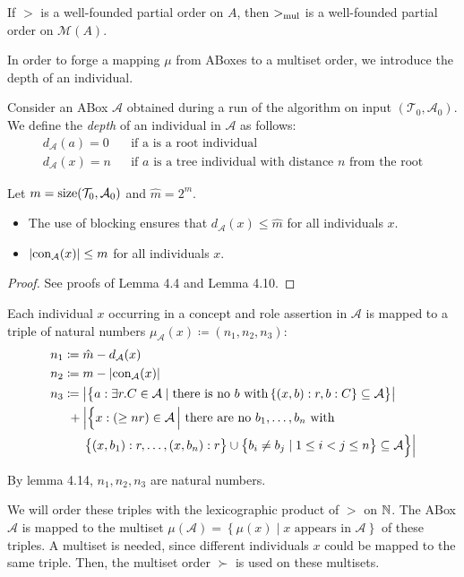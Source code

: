 \begin{theorem*}
	If $>$ is a well-founded partial order on $A$,
	then $>_{\mathit{\text{mul}}}$ is a well-founded partial order on $\mathcal{M}(A)$.
\end{theorem*}

In order to forge a mapping $\mu$ from ABoxes to a multiset order, we introduce the depth of an individual.

Consider an ABox $\mathcal{A}$ obtained during a run of the algorithm on input $(\mathcal{T}_0, \mathcal{A}_0)$.
We define the \textit{depth} of an individual in $\mathcal{A}$ as follows:
\begin{align*}
	d_{\mathcal{A}}(a) = 0 && \text{if a is a root individual}\\
	d_{\mathcal{A}}(x) = n && \text{if $a$ is a tree individual with distance $n$ from the root}
\end{align*}
\begin{lemma}
	Let $m = \operatorname{\text{size}}(\mathcal{T}_0, \mathcal{A}_0)$ and $\hat{m} = 2^m$.
	\begin{itemize}
		\item The use of blocking ensures that $d_{\mathcal{A}}(x) \leq \hat{m}$ for all individuals $x$.
		\item $\lvert \operatorname{\text{con}}_{\mathcal{A}}(x)  \rvert \leq m$ for all individuals $x$.
	\end{itemize}
\end{lemma}
\begin{proof}
	See proofs of Lemma 4.4 and Lemma 4.10.
\end{proof}

Each individual $x$ occurring in a concept and role assertion in $\mathcal{A}$ is mapped to
a triple of natural numbers $\mu_{\mathcal{A}}(x) \coloneqq (n_1, n_2, n_3)$:
\[
\begin{split}
	n_1 &\coloneqq \hat{m} - d_{\mathcal{A}}(x)\\
	n_2 &\coloneqq m - \lvert \func{con}_{\mathcal{A}}(x) \rvert \\
	n_3 &\coloneqq \left| \big\{ a: \exists r.C \in \mathcal{A} \mid \text{there is no $b$ with} \left\{ (x,b):r, b:C \right\} \subseteq \mathcal{A} \big\} \right|\\
		&\ + \left| \Big\{ x:( \geq n r) \in \mathcal{A} \,\Big|\ \text{there are no $b_1, \ldots, b_n$ with} \right.\\
		&\hspace{.5cm} \left. \big\{ (x,b_1):r, \ldots, (x,b_n):r \big\} \cup \big\{ b_i \neq b_j \mid 1 \leq i < j \leq n \big\} \subseteq \mathcal{A} \Big\} \right|
\end{split}
\]
\begin{note}
	By lemma 4.14, $n_1, n_2, n_3$ are natural numbers.
\end{note}
We will order these triples with the lexicographic product of $>$ on $\mathbb{N}$.
The ABox $\mathcal{A}$ is mapped to the multiset $\mu(\mathcal{A}) = \left\{ \mu(x) \mid \text{$x$ appears in $\mathcal{A}$} \right\}$ of these triples.
A multiset is needed, since different individuals $x$ could be mapped to the same triple.
Then, the multiset order $\succ$ is used on these multisets.

